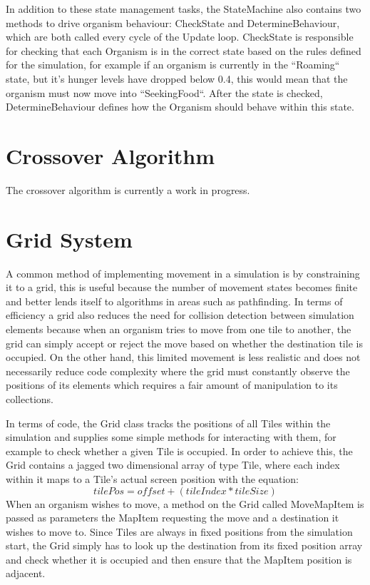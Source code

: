 \documentclass[a4paper, oneside, 11pt]{report}
\begin{document}
In addition to these state management tasks, the StateMachine also contains two methods to drive organism behaviour: CheckState and DetermineBehaviour, which are both called every cycle of the Update loop. CheckState is responsible for checking that each Organism is in the correct state based on the rules defined for the simulation, for example if an organism is currently in the ``Roaming`` state, but it's hunger levels have dropped below 0.4, this would mean that the organism must now move into ``SeekingFood``. After the state is checked, DetermineBehaviour defines how the Organism should behave within this state.

\section{Crossover Algorithm}\label{crossover}
The crossover algorithm is currently a work in progress.

\section{Grid System}\label{grid}
A common method of implementing movement in a simulation is by constraining it to a grid, this is useful because the number of movement states becomes finite and better lends itself to algorithms in areas such as pathfinding. In terms of efficiency a grid also reduces the need for collision detection between simulation elements because when an organism tries to move from one tile to another, the grid can simply accept or reject the move based on whether the destination tile is occupied. On the other hand, this limited movement is less realistic and does not necessarily reduce code complexity where the grid must constantly observe the positions of its elements which requires a fair amount of manipulation to its collections. 

In terms of code, the Grid class tracks the positions of all Tiles within the simulation and supplies some simple methods for interacting with them, for example to check whether a given Tile is occupied. In order to achieve this, the Grid contains a jagged two dimensional array of type Tile, where each index within it maps to a Tile's actual screen position with the equation:
\[tilePos = offset + (tileIndex * tileSize)\]
When an organism wishes to move, a method on the Grid called MoveMapItem is passed as parameters the MapItem requesting the move and a destination it wishes to move to. Since Tiles are always in fixed positions from the simulation start, the Grid simply has to look up the destination from its fixed position array and check whether it is occupied and then ensure that the MapItem position is adjacent.
\end{document}
